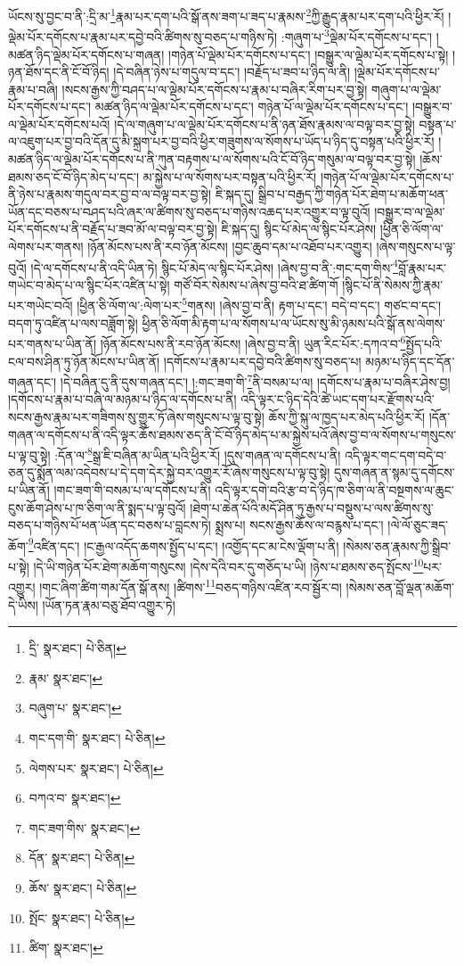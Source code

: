 ཡོངས་སུ་བྱང་བ་ནི་:དྲི་མ་\footnote{དྲི་  སྣར་ཐང་།  པེ་ཅིན། }རྣམ་པར་དག་པའི་སྒོ་ནས་ཟག་པ་ཟད་པ་རྣམས་\footnote{རྣམ་  སྣར་ཐང་། }ཀྱི་རྒྱུད་རྣམ་པར་དག་པའི་ཕྱིར་རོ། །ལྡེམ་པོར་དགོངས་པ་རྣམ་པར་དབྱེ་བའི་ཚིགས་སུ་བཅད་པ་གཉིས་ཏེ། :གཞུག་པ་\footnote{བཞུག་པ་  སྣར་ཐང་། }ལྡེམ་པོར་དགོངས་པ་དང་། །མཚན་ཉིད་ལྡེམ་པོར་དགོངས་པ་གཞན། །གཉེན་པོ་ལྡེམ་པོར་དགོངས་པ་དང་། །བསྒྱུར་ལ་ལྡེམ་པོར་དགོངས་པ་སྟེ། །ཉན་ཐོས་དང་ནི་ངོ་བོ་ཉིད། །དེ་བཞིན་ཉེས་པ་གདུལ་བ་དང་། །བརྗོད་པ་ཟབ་པ་ཉིད་ལ་ནི། །ལྡེམ་པོར་དགོངས་པ་རྣམ་པ་བཞི། །སངས་རྒྱས་ཀྱི་བཤད་པ་ལ་ལྡེམ་པོར་དགོངས་པ་རྣམ་པ་བཞིར་རིག་པར་བྱ་སྟེ། གཞུག་པ་ལ་ལྡེམ་པོར་དགོངས་པ་དང་། མཚན་ཉིད་ལ་ལྡེམ་པོར་དགོངས་པ་དང་། གཉེན་པོ་ལ་ལྡེམ་པོར་དགོངས་པ་དང་། །བསྒྱུར་བ་ལ་ལྡེམ་པོར་དགོངས་པའོ། །དེ་ལ་གཞུག་པ་ལ་ལྡེམ་པོར་དགོངས་པ་ནི་ཉན་ཐོས་རྣམས་ལ་བལྟ་བར་བྱ་སྟེ། བསྟན་པ་ལ་འཇུག་པར་བྱ་བའི་དོན་དུ་མི་སྐྲག་པར་བྱ་བའི་ཕྱིར་གཟུགས་ལ་སོགས་པ་ཡོད་པ་ཉིད་དུ་བསྟན་པའི་ཕྱིར་རོ། །མཚན་ཉིད་ལ་ལྡེམ་པོར་དགོངས་པ་ནི་ཀུན་བརྟགས་པ་ལ་སོགས་པའི་ངོ་བོ་ཉིད་གསུམ་ལ་བལྟ་བར་བྱ་སྟེ། །ཆོས་ཐམས་ཅད་ངོ་བོ་ཉིད་མེད་པ་དང་། མ་སྐྱེས་པ་ལ་སོགས་པར་བསྟན་པའི་ཕྱིར་རོ། །གཉེན་པོ་ལ་ལྡེམ་པོར་དགོངས་པ་ནི་ཉེས་པ་རྣམས་གདུལ་བར་བྱ་བ་ལ་བལྟ་བར་བྱ་སྟེ། ཇི་སྐད་དུ། སྒྲིབ་པ་བརྒྱད་ཀྱི་གཉེན་པོར་ཐེག་པ་མཆོག་ཕན་ཡོན་དང་བཅས་པ་བཤད་པའི་ཞར་ལ་ཚིགས་སུ་བཅད་པ་གཉིས་འཆད་པར་འགྱུར་བ་ལྟ་བུའོ། །བསྒྱུར་བ་ལ་ལྡེམ་པོར་དགོངས་པ་ནི་བརྗོད་པ་ཟབ་མོ་ལ་བལྟ་བར་བྱ་སྟེ། ཇི་སྐད་དུ། སྙིང་པོ་མེད་ལ་སྙིང་པོར་ཤེས། །ཕྱིན་ཅི་ལོག་ལ་ལེགས་པར་གནས། །ཉོན་མོངས་པས་ནི་རབ་ཉོན་མོངས། །བྱང་ཆུབ་དམ་པ་འཐོབ་པར་འགྱུར། །ཞེས་གསུངས་པ་ལྟ་བུའོ། །དེ་ལ་དགོངས་པ་ནི་འདི་ཡིན་ཏེ། སྙིང་པོ་མེད་ལ་སྙིང་པོར་ཤེས། །ཞེས་བྱ་བ་ནི་:གང་དག་གིས་\footnote{གང་དག་གི་  སྣར་ཐང་།  པེ་ཅིན། }བློ་རྣམ་པར་གཡེང་བ་མེད་པ་ལ་སྙིང་པོར་འཛིན་པ་སྟེ། གཙོ་བོར་སེམས་པ་ཞེས་བྱ་བའི་ཐ་ཚིག་གོ །སྙིང་པོ་ནི་སེམས་ཀྱི་རྣམ་པར་གཡེང་བའོ། །ཕྱིན་ཅི་ལོག་ལ་:ལེག་པར་\footnote{ལེགས་པར་  སྣར་ཐང་།  པེ་ཅིན། }གནས། །ཞེས་བྱ་བ་ནི། རྟག་པ་དང་། བདེ་བ་དང་། གཙང་བ་དང་། བདག་ཏུ་འཛིན་པ་ལས་བཟློག་སྟེ། ཕྱིན་ཅི་ལོག་མི་རྟག་པ་ལ་སོགས་པ་ལ་ཡོངས་སུ་མི་ཉམས་པའི་སྒོ་ནས་ལེགས་པར་གནས་པ་ཡིན་ནོ། །ཉོན་མོངས་པས་ནི་རབ་ཉོན་མོངས། །ཞེས་བྱ་བ་ནི། ཡུན་རིང་པོར་:དཀའ་བ་\footnote{བཀའ་བ་  སྣར་ཐང་། }སྤྱོད་པའི་ངལ་བས་ཤིན་ཏུ་ཉོན་མོངས་པ་ཡིན་ནོ། །དགོངས་པ་རྣམ་པར་དབྱེ་བའི་ཚིགས་སུ་བཅད་པ། མཉམ་པ་ཉིད་དང་དོན་གཞན་དང་། །དེ་བཞིན་དུ་ནི་དུས་གཞན་དང་། །:གང་ཟག་གི་\footnote{གང་ཟག་གིས་  སྣར་ཐང་། }ནི་བསམ་པ་ལ། །དགོངས་པ་རྣམ་པ་བཞིར་ཤེས་བྱ། །དགོངས་པ་རྣམ་པ་བཞི་ལ་མཉམ་པ་ཉིད་ལ་དགོངས་པ་ནི། འདི་ལྟར་ང་ཉིད་དེའི་ཚེ་ཡང་དག་པར་རྫོགས་པའི་སངས་རྒྱས་རྣམ་པར་གཟིགས་སུ་གྱུར་ཏོ་ཞེས་གསུངས་པ་ལྟ་བུ་སྟེ། ཆོས་ཀྱི་སྐུ་ལ་ཁྱད་པར་མེད་པའི་ཕྱིར་རོ། །དོན་གཞན་ལ་དགོངས་པ་ནི་འདི་ལྟར་ཆོས་ཐམས་ཅད་ནི་ངོ་བོ་ཉིད་མེད་པ་མ་སྐྱེས་པའོ་ཞེས་བྱ་བ་ལ་སོགས་པ་གསུངས་པ་ལྟ་བུ་སྟེ། :དོན་ལ་\footnote{དོན་  སྣར་ཐང་།  པེ་ཅིན། }སྒྲ་ཇི་བཞིན་མ་ཡིན་པའི་ཕྱིར་རོ། །དུས་གཞན་ལ་དགོངས་པ་ནི། འདི་ལྟར་གང་དག་བདེ་བ་ཅན་དུ་སྨོན་ལམ་འདེབས་པ་དེ་དག་དེར་སྐྱེ་བར་འགྱུར་རོ་ཞེས་གསུངས་པ་ལྟ་བུ་སྟེ། དུས་གཞན་ན་སྙམ་དུ་དགོངས་པ་ཡིན་ནོ། །གང་ཟག་གི་བསམ་པ་ལ་དགོངས་པ་ནི། འདི་ལྟར་དགེ་བའི་རྩ་བ་དེ་ཉིད་ཁ་ཅིག་ལ་ནི་བསྔགས་ལ་ཆུང་ངུས་ཆོག་ཤེས་པ་ཁ་ཅིག་ལ་ནི་སྨད་པ་ལྟ་བུའོ། །ཐེག་པ་ཆེན་པོའི་མདོ་ཤིན་ཏུ་རྒྱས་པ་བསྡུས་པ་ལས་ཚིགས་སུ་བཅད་པ་གཉིས་པོ་ཕན་ཡོན་དང་བཅས་པ་བླངས་ཏེ། སྨྲས་པ། སངས་རྒྱས་ཆོས་ལ་བརྙས་པ་དང་། །ལེ་ལོ་ཅུང་ཟད་ཆོག་\footnote{ཆོས་  སྣར་ཐང་།  པེ་ཅིན། }འཛིན་དང་། །ང་རྒྱལ་འདོད་ཆགས་སྤྱོད་པ་དང་། །འགྱོད་དང་མ་ངེས་ལྡོག་པ་ནི། །སེམས་ཅན་རྣམས་ཀྱི་སྒྲིབ་པ་སྟེ། །དེ་ཡི་གཉེན་པོར་ཐེག་མཆོག་གསུངས། །དེས་དེའི་བར་དུ་གཅོད་པ་ཡི། །ཉེས་པ་ཐམས་ཅད་སྤོངས་\footnote{སྤོང་  སྣར་ཐང་།  པེ་ཅིན། }པར་འགྱུར། །གང་ཞིག་ཚིག་གམ་དོན་སྒོ་ནས། །ཚིགས་\footnote{ཚིག་  སྣར་ཐང་། }བཅད་གཉིས་འཛིན་རབ་སྦྱོར་བ། །སེམས་ཅན་བློ་ལྡན་མཆོག་དེ་ཡིས། །ཡོན་ཏན་རྣམ་བཅུ་ཐོབ་འགྱུར་ཏེ། 